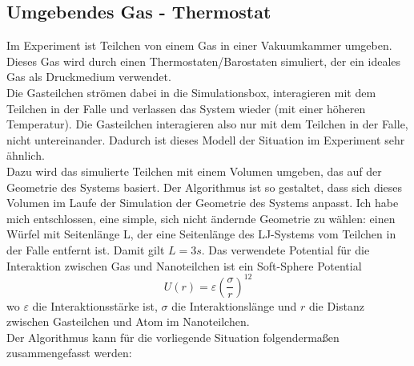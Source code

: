 \documentclass[12pt]{article}
\begin{document}
\subsection{Umgebendes Gas - Thermostat}
Im Experiment ist Teilchen von einem Gas in einer Vakuumkammer umgeben. Dieses Gas wird durch einen Thermostaten/Barostaten 
simuliert, der ein ideales Gas als Druckmedium verwendet.\\
Die Gasteilchen strömen dabei in die Simulationsbox, interagieren mit dem Teilchen in der Falle und verlassen das System wieder (mit einer höheren
Temperatur). Die Gasteilchen interagieren also nur mit dem Teilchen in der Falle, nicht untereinander. Dadurch ist dieses Modell der 
Situation im Experiment sehr ähnlich.\\
Dazu wird das simulierte Teilchen mit einem Volumen umgeben, das auf der Geometrie des Systems basiert. Der Algorithmus ist so 
gestaltet, dass sich dieses Volumen im Laufe der Simulation der Geometrie des Systems anpasst. Ich habe mich entschlossen, eine simple, sich nicht
ändernde Geometrie zu wählen: einen Würfel mit Seitenlänge L, der eine Seitenlänge des LJ-Systems vom Teilchen in der Falle entfernt ist. Damit gilt
$L = 3s$. Das verwendete Potential für die Interaktion zwischen Gas und Nanoteilchen ist ein Soft-Sphere Potential
\begin{equation}
    \label{eq:softsphere}
    U(r) = \varepsilon \left(\frac{\sigma}{r}\right)^{12}
\end{equation}
wo $\varepsilon$ die Interaktionsstärke ist, $\sigma$ die Interaktionslänge und $r$ die Distanz zwischen Gasteilchen und Atom im Nanoteilchen.\\
Der Algorithmus kann für die vorliegende Situation folgendermaßen zusammengefasst werden:
\end{document}
